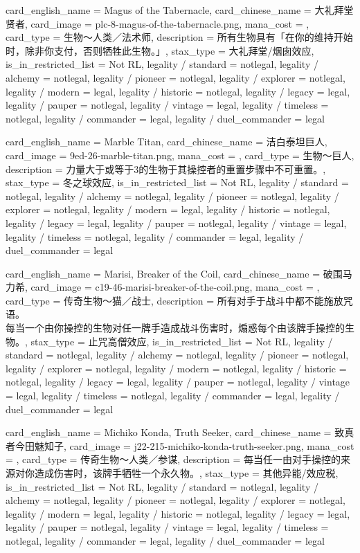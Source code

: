 \documentclass[lang = cn, color = black, 10pt]{AllThatStax}
\begin{document}
\card
{
	card_english_name = {Magus of the Tabernacle},
	card_chinese_name = {大礼拜堂贤者},
	card_image = plc-8-magus-of-the-tabernacle.png,
	mana_cost = ,
	card_type = 生物～人类／法术师,
	description = {所有生物具有「在你的维持开始时，除非你支付，否则牺牲此生物。」},
	stax_type = 大礼拜堂/烟囱效应,
	is_in_restricted_list = Not RL,
	legality / standard = notlegal,
	legality / alchemy = notlegal,
	legality / pioneer = notlegal,
	legality / explorer = notlegal,
	legality / modern = legal,
	legality / historic = notlegal,
	legality / legacy = legal,
	legality / pauper = notlegal,
	legality / vintage = legal,
	legality / timeless = notlegal,
	legality / commander = legal,
	legality / duel_commander = legal
}

\card
{
	card_english_name = {Marble Titan},
	card_chinese_name = {洁白泰坦巨人},
	card_image = 9ed-26-marble-titan.png,
	mana_cost = ,
	card_type = 生物～巨人,
	description = {力量大于或等于3的生物于其操控者的重置步骤中不可重置。},
	stax_type = 冬之球效应,
	is_in_restricted_list = Not RL,
	legality / standard = notlegal,
	legality / alchemy = notlegal,
	legality / pioneer = notlegal,
	legality / explorer = notlegal,
	legality / modern = legal,
	legality / historic = notlegal,
	legality / legacy = legal,
	legality / pauper = notlegal,
	legality / vintage = legal,
	legality / timeless = notlegal,
	legality / commander = legal,
	legality / duel_commander = legal
}

\card
{
	card_english_name = {Marisi, Breaker of the Coil},
	card_chinese_name = {破围马力希},
	card_image = c19-46-marisi-breaker-of-the-coil.png,
	mana_cost = ,
	card_type = 传奇生物～猫／战士,
	description = {所有对手于战斗中都不能施放咒语。\\
每当一个由你操控的生物对任一牌手造成战斗伤害时，煽惑每个由该牌手操控的生物。},
	stax_type = 止咒高僧效应,
	is_in_restricted_list = Not RL,
	legality / standard = notlegal,
	legality / alchemy = notlegal,
	legality / pioneer = notlegal,
	legality / explorer = notlegal,
	legality / modern = notlegal,
	legality / historic = notlegal,
	legality / legacy = legal,
	legality / pauper = notlegal,
	legality / vintage = legal,
	legality / timeless = notlegal,
	legality / commander = legal,
	legality / duel_commander = legal
}

\card
{
	card_english_name = {Michiko Konda, Truth Seeker},
	card_chinese_name = {致真者今田魅知子},
	card_image = j22-215-michiko-konda-truth-seeker.png,
	mana_cost = ,
	card_type = 传奇生物～人类／参谋,
	description = {每当任一由对手操控的来源对你造成伤害时，该牌手牺牲一个永久物。},
	stax_type = 其他异能/效应税,
	is_in_restricted_list = Not RL,
	legality / standard = notlegal,
	legality / alchemy = notlegal,
	legality / pioneer = notlegal,
	legality / explorer = notlegal,
	legality / modern = legal,
	legality / historic = notlegal,
	legality / legacy = legal,
	legality / pauper = notlegal,
	legality / vintage = legal,
	legality / timeless = notlegal,
	legality / commander = legal,
	legality / duel_commander = legal
}
\end{document}
